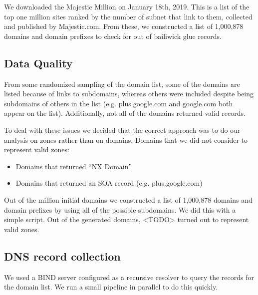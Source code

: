 \documentclass{idc_msc}
\begin{document}
We downloaded the Majestic Million\cite{MajesticMillion} on January 18th, 2019.
This is a list of the top one million sites ranked by the number of subnet that link to them, collected and published by Majestic.com.
From these, we constructed a list of 1,000,878 domains and domain prefixes to check for out of bailiwick glue records.

\subsection{Data Quality}
From some randomized sampling of the domain list, some of the domains are listed because of links to subdomains, whereas others were included despite being subdomains of others in the list (e.g. plus.google.com and google.com both appear on the list). Additionally, not all of the domains returned valid records.

To deal with these issues we decided that the correct approach was to do our analysis on zones rather than on domains. Domains that we did not consider to represent valid zones:
\begin{itemize}
  \item Domains that returned “NX Domain”
  \item Domains that returned an SOA record (e.g. plus.google.com)
\end{itemize}

Out of the million initial domains we constructed a list of 1,000,878 domains and domain prefixes by using all of the possible subdomains. We did this with a simple script. Out of the generated domains, <TODO> turned out to represent valid zones.


\subsection{DNS record collection}

We used a BIND server configured as a recursive resolver to query the records for the domain list.
We run a small pipeline in parallel\cite{Tange2011a} to do this quickly.


\end{document}
